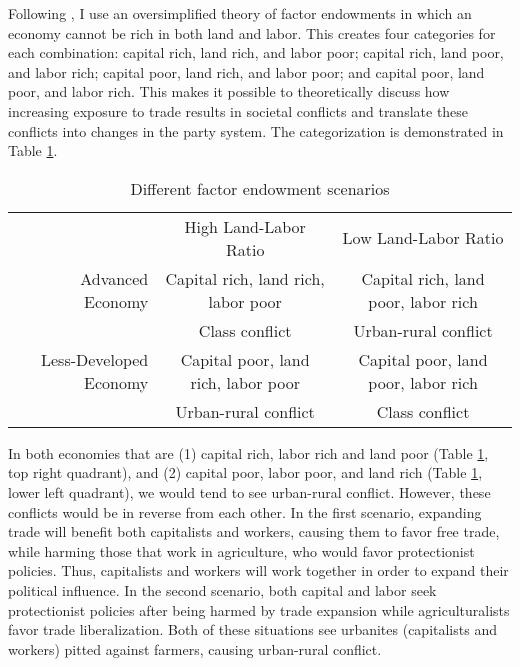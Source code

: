 \documentclass[12pt,letterpaper]{article}
\begin{document}
Following \citet{Rogowski1987}, I use an oversimplified theory of factor endowments in which an economy cannot be rich in both land and labor. This creates four categories for each combination: capital rich, land rich, and labor poor; capital rich, land poor, and labor rich; capital poor, land rich, and labor poor; and capital poor, land poor, and labor rich. This makes it possible to theoretically discuss how increasing exposure to trade results in societal conflicts and translate these conflicts into changes in the party system. The categorization is demonstrated in Table \ref{tab:categories}.

\singlespace
\begin{table}[H]
\small
\begin{center}
\begin{tabular}{ r | c | c |}
\multicolumn{1}{r}{}
 &  \multicolumn{1}{c}{High Land-Labor Ratio}
 & \multicolumn{1}{c}{Low Land-Labor Ratio} \\
\cline{2-3}
Advanced Economy & Capital rich, land rich, labor poor & Capital rich, land poor, labor rich \\
	& Class conflict & Urban-rural conflict \\
\cline{2-3}
Less-Developed Economy & Capital poor, land rich, labor poor & Capital poor, land poor, labor rich \\
	& Urban-rural conflict	&Class conflict \\
\cline{2-3}
\end{tabular}\caption{Different factor endowment scenarios}\label{tab:categories}
\end{center}
\end{table}
\doublespace
\normalsize

In both economies that are (1) capital rich, labor rich and land poor (Table \ref{tab:categories}, top right quadrant), and (2) capital poor, labor poor, and land rich (Table \ref{tab:categories}, lower left quadrant), we would tend to see urban-rural conflict. However, these conflicts would be in reverse from each other. In the first scenario, expanding trade will benefit both capitalists and workers, causing them to favor free trade, while harming those that work in agriculture, who would favor protectionist policies. Thus, capitalists and workers will work together in order to expand their political influence. In the second scenario, both capital and labor seek protectionist policies after being harmed by trade expansion while agriculturalists favor trade liberalization. Both of these situations see urbanites (capitalists and workers) pitted against farmers, causing urban-rural conflict. 
\end{document}

